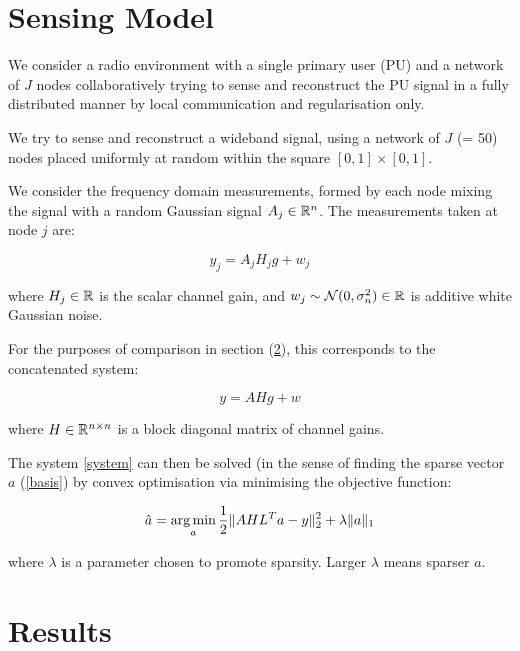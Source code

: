 \section{Sensing Model}\label{sec:sensingmodel}

We consider a radio environment with a single primary user (PU) and a network of \(J\) nodes collaboratively trying to sense and reconstruct the PU signal in a fully distributed manner by local communication and regularisation only.

We try to sense and reconstruct a wideband signal, using a network of \(J\) (= 50) nodes placed uniformly at random within the square \(  \left[0,1\right]\times \left[0,1\right] \). 

We consider the frequency domain measurements, formed by each node mixing the signal with a random Gaussian signal \(A_j \in {\mathbb{R}}^n\). The measurements taken at node \(j\) are:

\begin{equation}
y_j = A_jH_jg + w_j
\label{dist_system}
\end{equation}

where \(H_j \in {\mathbb{R}}\) is the scalar channel gain, and \(w_j \sim \mathcal{N}(0,\sigma^2_n) \in {\mathbb{R}} \) is additive white Gaussian noise. 

For the purposes of comparison in section (\ref{sec:results}), this corresponds to the concatenated system:

\begin{equation}
y = AHg + w
\label{system}
\end{equation}

where \(H \in {\mathbb{R}}^{n \times n}\) is a block diagonal matrix of channel gains.

The system  \ref{system} can then be solved (in the sense of finding the sparse vector \(a\) (\ref{basis}) by convex optimisation via minimising the objective function:

\begin{equation}
\hat{a} = \operatorname*{arg\,min}_{a} \frac{1}{2}\|AHL^{T}a-y\|_2^2 + \lambda \|a\|_1
\label{opt}
\end{equation}

where \(\lambda\) is a parameter chosen to promote sparsity. Larger \(\lambda\) means sparser \(a\).

\section{Results} \label{sec:results}

